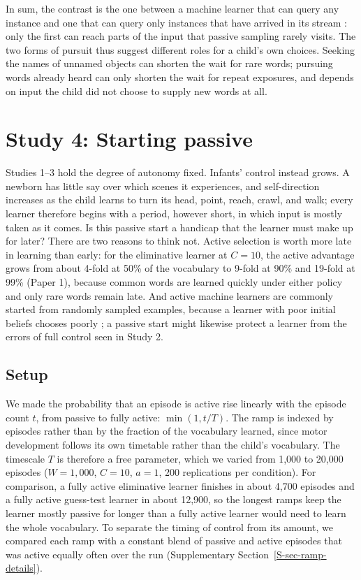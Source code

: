 \documentclass[a4paper,natbib,man]{apa6}
\begin{document}
In sum, the contrast is the one between a machine learner that can query any instance \citep{Angluin:1988} and one that can query only instances that have arrived in its stream \citep{Settles:2012}: only the first can reach parts of the input that passive sampling rarely visits. The two forms of pursuit thus suggest different roles for a child's own choices. Seeking the names of unnamed objects can shorten the wait for rare words; pursuing words already heard can only shorten the wait for repeat exposures, and depends on input the child did not choose to supply new words at all.

\section{Study 4: Starting passive}
\label{sec-ramp}

Studies 1--3 hold the degree of autonomy fixed. Infants' control instead grows. A newborn has little say over which scenes it experiences, and self-direction increases as the child learns to turn its head, point, reach, crawl, and walk; every learner therefore begins with a period, however short, in which input is mostly taken as it comes. Is this passive start a handicap that the learner must make up for later? There are two reasons to think not. Active selection is worth more late in learning than early: for the eliminative learner at $C=10$, the active advantage grows from about 4-fold at 50\% of the vocabulary to 9-fold at 90\% and 19-fold at 99\% (Paper 1), because common words are learned quickly under either policy and only rare words remain late. And active machine learners are commonly started from randomly sampled examples, because a learner with poor initial beliefs chooses poorly \citep{Settles:2012}; a passive start might likewise protect a learner from the errors of full control seen in Study 2.

\subsection{Setup}
We made the probability that an episode is active rise linearly with the episode count $t$, from passive to fully active: $\min(1, t/T)$. The ramp is indexed by episodes rather than by the fraction of the vocabulary learned, since motor development follows its own timetable rather than the child's vocabulary. The timescale $T$ is therefore a free parameter, which we varied from 1,000 to 20,000 episodes ($W=1{,}000$, $C=10$, $a=1$, 200 replications per condition). For comparison, a fully active eliminative learner finishes in about 4,700 episodes and a fully active guess-test learner in about 12,900, so the longest ramps keep the learner mostly passive for longer than a fully active learner would need to learn the whole vocabulary. To separate the timing of control from its amount, we compared each ramp with a constant blend of passive and active episodes that was active equally often over the run (Supplementary Section~\ref{S-sec-ramp-details}).
\end{document}
